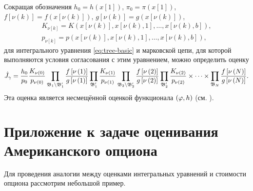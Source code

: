 Сокращая обозначения $h_0 = h(x[1])$, $\pi_0 = \pi(x[1])$, $f[\nu(k)] = f\left(x\left[\nu\left(k\right)\right]\right)$, $g[\nu(k)] = g\left(x\left[\nu\left(k\right)\right]\right)$, 
\begin{align*}
K_{\nu[k]} = K\left(x\left[\nu(k)\right], x\left[\nu(k),1\right], \ldots ,x\left[\nu(k),b\right]\right), \\
p_{\nu[k]} = p\left(x\left[\nu(k)\right], x\left[\nu(k),1\right], \ldots ,x\left[\nu(k),b\right]\right),
\end{align*}
для интегрального уравнения \eqref{eq:tree-basic} и марковской цепи, для которой выполняются условия согласования с этим уравнением, можно определить оценку
\begin{equation}\label{eq:accumulation-estimator}
	\hat{J}_\gamma = \frac{h_0}{p_0}\frac{K_{\nu(0)}}{p_{\nu(0)}}\prod_{\mathfrak{B}_1\setminus\mathfrak{B}'_1}\frac{f\left[\nu\left(1\right)\right]}{g\left[\nu\left(1\right)\right]}\prod_{\mathfrak{B}'_1} \frac{K_{\nu(1)}}{p_{\nu(1)}}\prod_{\mathfrak{B}_2\setminus\mathfrak{B}'_2}\frac{f\left[\nu\left(2\right)\right]}{g\left[\nu\left(2\right)\right]}\prod_{\mathfrak{B}'_2} \frac{K_{\nu(2)}}{p_{\nu(2)}}\times\cdots\times\prod_{\mathfrak{B}_N} \frac{f\left[\nu\left(N\right)\right]}{g\left[\nu\left(N\right)\right]}.
\end{equation}
Эта оценка является несмещённой оценкой функционала $\left(\varphi, h\right)$ (см. \cite{montekarlo1975}).


\section{Приложение к задаче оценивания Американского опциона}
Для проведения аналогии между оценками интегральных уравнений и стоимости опциона рассмотрим небольшой пример.

